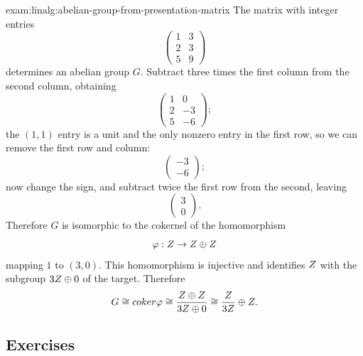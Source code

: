\begin{exam}{}{exam:linalg:abelian-group-from-presentation-matrix}
  The matrix with integer entries
  \[
    \begin{pmatrix} 1 & 3 \\ 2 & 3 \\ 5 & 9 \end{pmatrix}
  \]
  determines an abelian group $G$. Subtract three times the first
  column from the second column, obtaining
  \[
    \begin{pmatrix} 1 & 0 \\ 2 & -3 \\ 5 & -6 \end{pmatrix};
  \]
  the $(1,1)$ entry is a unit and the only nonzero entry in the first
  row, so we can remove the first row and column:
  \[
    \begin{pmatrix} -3 \\ -6 \end{pmatrix};
  \]
  now change the sign, and subtract twice the first row from the
  second, leaving
  \[
    \begin{pmatrix} 3 \\ 0 \end{pmatrix}.
  \]
  Therefore $G$ is isomorphic to the cokernel of the homomorphism
  \[
    \varphi : Z \to Z \oplus Z
  \]
  mapping $1$ to $(3,0)$. This homomorphism is injective and
  identifies $Z$ with the subgroup $3Z \oplus 0$ of the target.
  Therefore
  \[
    G \cong coker\varphi \cong \frac{Z \oplus Z}{3Z \oplus 0}
    \cong \frac{Z}{3Z} \oplus Z.
  \]
\end{exam}

\subsection*{Exercises}


